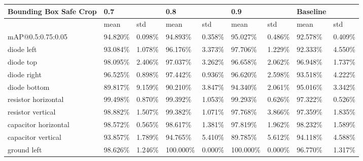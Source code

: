 
\begin{table}[H]
\scriptsize %
\begin{center}
\begin{tabular}{|l|l|l|l|l|l|l|l|l|}
\hline
Bounding Box Safe Crop          & 0.7      &          & 0.8      &          & \cellcolor{green}0.9      &          & Baseline &              \\
\hline
                                & mean     & std      & mean     & std      & mean     & std      & mean     & std          \\
\hline
mAP@0.5:0.75:0.05               & 94.820\%  & 0.098\% & 94.893\%  & 0.358\% & \cellcolor{green}95.027\%  & 0.486\%  & 92.578\%  & 0.409\%   \\
\hline
\rowcolor{lightgray!50}
diode left                      & 93.084\%  & 1.078\% & 96.176\%  & 3.373\% & 97.706\%  & 1.229\%  & 92.333\%  & 4.550\%   \\
diode top                       & 98.095\%  & 2.406\% & 97.037\%  & 3.262\% & 96.658\%  & 2.062\%  & 96.948\%  & 1.737\%   \\
\rowcolor{lightgray!50}
diode right                     & 96.525\%  & 0.898\% & 97.442\%  & 0.936\% & 96.620\%  & 2.598\%  & 93.518\%  & 4.222\%   \\
diode bottom                    & 89.817\%  & 9.159\% & 90.210\%  & 3.847\% & 94.340\%  & 2.061\%  & 95.016\%  & 3.342\%   \\
\rowcolor{lightgray!50}
resistor horizontal             & 99.498\%  & 0.870\% & 99.392\%  & 1.053\% & 99.293\%  & 0.626\%  & 97.322\%  & 0.526\%   \\
resistor vertical               & 98.882\%  & 1.507\% & 99.382\%  & 1.071\% & 97.768\%  & 3.866\%  & 97.359\%  & 1.835\%   \\
\rowcolor{lightgray!50}
capacitor horizontal            & 98.572\%  & 0.565\% & 98.617\%  & 1.381\% & 97.819\%  & 1.962\%  & 98.232\%  & 1.589\%   \\
capacitor vertical              & 93.857\%  & 1.789\% & 94.765\%  & 5.410\% & 89.785\%  & 5.612\%  & 94.118\%  & 4.588\%   \\
\rowcolor{lightgray!50}
ground left                     & 98.626\%  & 1.246\% & 100.000\% & 0.000\% & 100.000\% & 0.000\%  & 96.770\%  & 1.317\%   \\

\end{tabular}
\end{center}
\end{table}
